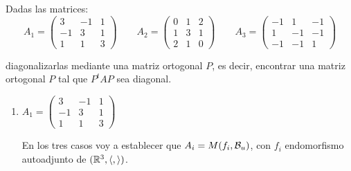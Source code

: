 \begin{ejercicio}
    Dadas las matrices:
    \begin{equation*}
        A_1 = \left(\begin{array}{ccc}
            3 & -1 & 1 \\
            -1 & 3 & 1 \\
            1 & 1 & 3
        \end{array}\right)
        \qquad
        A_2 = \left(\begin{array}{ccc}
            0 & 1 & 2 \\
            1 & 3 & 1 \\
            2 & 1 & 0
        \end{array}\right)
        \qquad
        A_3 = \left(\begin{array}{ccc}
            -1 & 1 & -1 \\
            1 & -1 & -1 \\
            -1 & -1 & 1
        \end{array}\right)
    \end{equation*}

    diagonalizarlas mediante una matriz ortogonal $P$, es decir, encontrar una matriz ortogonal $P$ tal que $P^tAP$ sea diagonal.



    \begin{enumerate}
        \item $A_1 = \left(\begin{array}{ccc}
            3 & -1 & 1 \\
            -1 & 3 & 1 \\
            1 & 1 & 3
        \end{array}\right)$

        En los tres casos voy a establecer que $A_i=M(f_i, \mathcal{B}_u)$, con $f_i$ endomorfismo autoadjunto de $(\mathbb{R}^3,\langle,\rangle)$.


\end{enumerate}
\end{ejercicio}
